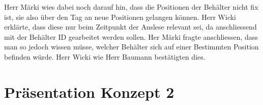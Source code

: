 \documentclass[parskip=full, a4paper]{scrreprt}
\begin{document}
Herr Märki wies dabei noch darauf hin, dass die Positionen der Behälter nicht fix ist, sie also über den Tag an neue Positionen gelangen können. Herr Wicki erklärte, dass diese nur beim Zeitpunkt der Auslese relevant sei, da anschliessend mit der Behälter ID gearbeitet werden sollen.
Her Märki fragte anschliessen, dass man so jedoch wissen müsse, welcher Behälter sich auf einer Bestimmten Position befinden würde. Herr Wicki wie Herr Baumann bestätigten dies.






















\chapter{Präsentation Konzept 2}
\end{document}
